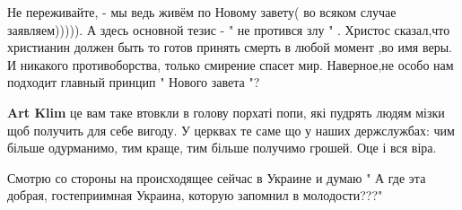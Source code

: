 \begin{itemize}
Не переживайте, - мы ведь живём по Новому завету( во всяком случае
заявляем))))). А здесь основной тезис - " не протився злу " . Христос
сказал,что христианин должен быть то готов принять смерть в любой момент ,во
имя веры. И никакого противоборства, только смирение спасет мир. Наверное,не
особо нам подходит главный принцип " Нового завета "?
\begin{itemize}
\textbf{Art Klim} це вам таке втовкли в голову порхаті попи, які пудрять людям мізки щоб получить для себе вигоду. У церквах те саме що у наших держслужбах: чим більше одурманимо, тим краще, тим більше получимо грошей. Оце і вся віра.
\end{itemize}

Смотрю со стороны на происходящее сейчас в Украине и думаю " А где эта добрая,
гостеприимная Украина, которую запомнил в молодости???"



\end{itemize}
